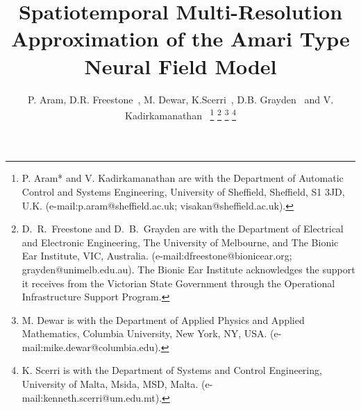 \documentclass[11pt,draftcls,onecolumn,peerreview]{IEEEtran}
\begin{document}
%
\title{Spatiotemporal Multi-Resolution Approximation of the Amari Type Neural Field Model}


\author{P. Aram, D.R. Freestone~, M. Dewar, K.Scerri~, D.B. Grayden~ and V. Kadirkamanathan~ %
\thanks{P. Aram* and V. Kadirkamanathan are with the Department of Automatic Control and Systems Engineering, University of Sheffield, Sheffield, S1 3JD, U.K. (e-mail:p.aram@sheffield.ac.uk; visakan@sheffield.ac.uk).}%
\thanks{D.\ R.\ Freestone and D.\ B.\ Grayden are with the Department
of Electrical and Electronic Engineering, The University of Melbourne, and The Bionic Ear Institute, VIC, Australia. (e-mail:dfreestone@bionicear.org; grayden@unimelb.edu.au). The Bionic Ear Institute acknowledges the support it receives from the Victorian State Government through the Operational Infrastructure Support Program.}
\thanks{M. Dewar is with the Department of Applied Physics and Applied Mathematics, Columbia University, New York, NY, USA. (e-mail:mike.dewar@columbia.edu).}
\thanks{K. Scerri is with the Department of Systems and Control Engineering, University
of Malta, Msida, MSD, Malta. (e-mail:kenneth.scerri@um.edu.mt).}}



% 
 \ifCLASSOPTIONpeerreview
\else
\fi


\maketitle
\end{document}
